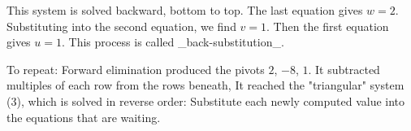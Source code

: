 This system is solved backward, bottom to top. The last equation gives \(w=2\). Substituting into the second equation, we find \(v=1\). Then the first equation gives \(u=1\). This process is called _back-substitution_.

To repeat: Forward elimination produced the pivots \(2\), \(-8\), \(1\). It subtracted multiples of each row from the rows beneath, It reached the "triangular" system (3), which is solved in reverse order: Substitute each newly computed value into the equations that are waiting.

